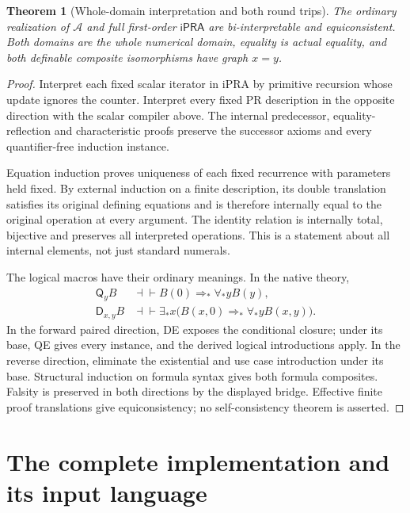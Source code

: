 \documentclass[11pt,letterpaper]{article}
\newtheorem{theorem}{Theorem}[section]
\theoremstyle{definition}\newtheorem{definition}[theorem]{Definition}
\theoremstyle{remark}\newtheorem{remark}[theorem]{Remark}
\newcommand{\ipra}{\mathsf{iPRA}}
\newcommand{\D}{\mathsf D}
\newcommand{\Q}{\mathsf Q}
\begin{document}
\begin{theorem}[Whole-domain interpretation and both round trips]
The ordinary realization of \(\mathcal A\) and full first-order
\(\ipra\) are bi-interpretable and equiconsistent. Both domains are
the whole numerical domain, equality is actual equality, and both
definable composite isomorphisms have graph \(x=y\).
\end{theorem}
\begin{proof}
Interpret each fixed scalar iterator in iPRA by primitive recursion
whose update ignores the counter. Interpret every fixed PR description
in the opposite direction with the scalar compiler above. The internal
predecessor, equality-reflection and characteristic proofs preserve the
successor axioms and every quantifier-free induction instance.

Equation induction proves uniqueness of each fixed recurrence with
parameters held fixed. By external induction on a finite description,
its double translation satisfies its original defining equations and
is therefore internally equal to the original operation at every
argument. The identity relation is internally total, bijective and
preserves all interpreted operations. This is a statement about all
internal elements, not just standard numerals.

The logical macros have their ordinary meanings. In the native theory,
\begin{align*}
 \Q_yB&\dashv\vdash B(0)\Rightarrow_*\forall_*yB(y),\\
 \D_{x,y}B&\dashv\vdash
 \exists_*x\bigl(B(x,0)\Rightarrow_*\forall_*yB(x,y)\bigr).
\end{align*}
In the forward paired direction, DE exposes the conditional closure;
under its base, QE gives every instance, and the derived logical
introductions apply. In the reverse direction, eliminate the
existential and use case introduction under its base. Structural
induction on formula syntax gives both formula composites. Falsity is
preserved in both directions by the displayed bridge. Effective finite
proof translations give equiconsistency; no self-consistency theorem
is asserted.
\end{proof}

\section{The complete implementation and its input language}
\label{sec:implementation}
\end{document}
